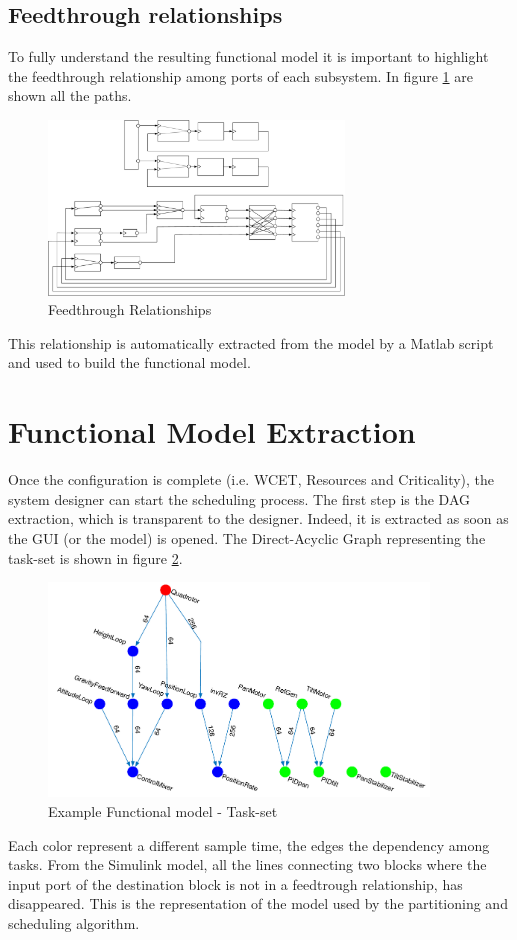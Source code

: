 \subsection{Feedthrough relationships}
To fully understand the resulting functional model it is important to highlight the feedthrough relationship among ports of each subsystem. In figure \ref{fig:feedthrough} are shown all the paths. 
\begin{figure}[htbp] 
\centering    
\includegraphics[width=0.7\textwidth]{FeedRelationships}
\caption{Feedthrough Relationships}
\label{fig:feedthrough}
\end{figure}
This relationship is automatically extracted from the model by a Matlab script and used to build the functional model.

\section{Functional Model Extraction}
Once the configuration is complete (i.e. WCET, Resources and Criticality), the system designer can start the scheduling process. The first step is the DAG extraction, which is transparent to the designer. Indeed, it is extracted  as soon as the GUI (or the model) is opened. The Direct-Acyclic Graph representing the task-set is shown in figure \ref{fig:extaskset}.
\begin{figure}[htbp] 
\centering    
\includegraphics[width=0.9\textwidth]{Taskset}
\caption{Example Functional model - Task-set}
\label{fig:extaskset}
\end{figure}
Each color represent a different sample time, the edges the dependency among tasks. From the Simulink model, all the lines connecting two blocks where the input port of the destination block is not in a feedtrough relationship, has disappeared. This is the representation of the model used by the partitioning and scheduling algorithm.

